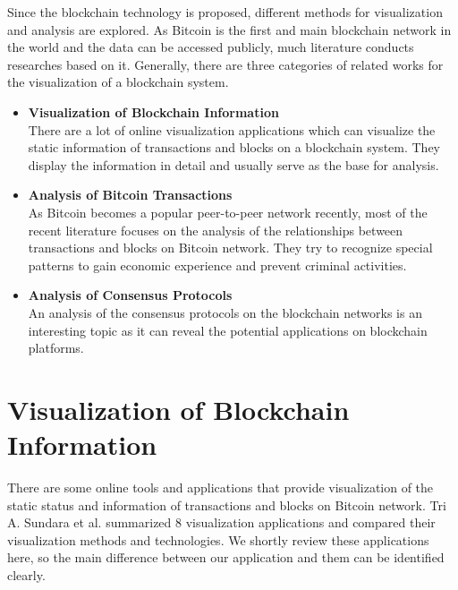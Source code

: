 Since the blockchain technology is proposed, different methods for visualization and analysis are explored. As Bitcoin is the first and main blockchain network in the world and the data can be accessed publicly, much literature conducts researches based on it. Generally, there are three categories of related works for the visualization of a blockchain system.
\begin{itemize}
    \item \textbf{Visualization of Blockchain Information} \\
        There are a lot of online visualization applications which can visualize the static information of transactions and blocks on a blockchain system. They display the information in detail and usually serve as the base for analysis.
    \item \textbf{Analysis of Bitcoin Transactions} \\
        As Bitcoin becomes a popular peer-to-peer network recently, most of the recent literature focuses on the analysis of the relationships between transactions and blocks on Bitcoin network. They try to recognize special patterns to gain economic experience and prevent criminal activities.
    \item \textbf{Analysis of Consensus Protocols} \\
        An analysis of the consensus protocols on the blockchain networks is an interesting topic as it can reveal the potential applications on blockchain platforms.
\end{itemize}

\section{Visualization of Blockchain Information}

There are some online tools and applications that provide visualization of the static status and information of transactions and blocks on Bitcoin network. Tri A. Sundara et al. \cite{Sundara2017} summarized 8 visualization applications and compared their visualization methods and technologies. We shortly review these applications here, so the main difference between our application and them can be identified clearly.
\clearpage


